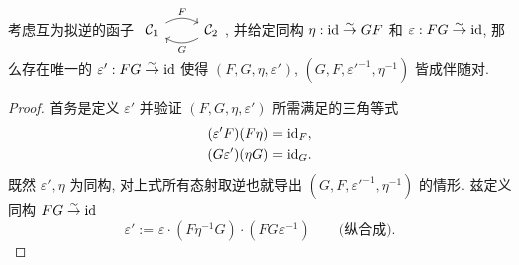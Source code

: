 \begin{theorem}[伴随等价] \label{prop:adjoint-equivalence}
	考虑互为拟逆的函子
	$\begin{tikzcd}
		\mathcal{C}_1 \arrow[r, bend left, "F"] & \mathcal{C}_2 \arrow[l, bend left, "G"]
	\end{tikzcd}$, 并给定同构 $\eta: \mathrm{id} \stackrel{\sim}{\rightarrow} GF$ 和 $\varepsilon: FG \stackrel{\sim}{\rightarrow} \mathrm{id}$, 那么存在唯一的 $\varepsilon': FG \stackrel{\sim}{\rightarrow} \mathrm{id}$ 使得 $(F, G, \eta, \varepsilon')$, $(G, F, \varepsilon'^{-1}, \eta^{-1})$ 皆成伴随对.
\end{theorem}
\begin{proof}
	首务是定义 $\varepsilon'$ 并验证 $(F, G, \eta, \varepsilon')$ 所需满足的三角等式
	\begin{align}
		\label{eqn:adj-zigzag-1} (\varepsilon' F)(F\eta) & = \mathrm{id}_F, \\
		\label{eqn:adj-zigzag-2} (G\varepsilon')(\eta G) & = \mathrm{id}_G.
	\end{align}
	既然 $\varepsilon', \eta$ 为同构, 对上式所有态射取逆也就导出 $(G, F, \varepsilon'^{-1}, \eta^{-1})$ 的情形. 兹定义同构 $FG \stackrel{\sim}{\rightarrow} \mathrm{id}$
	\[ \varepsilon' := \varepsilon \cdot (F\eta^{-1}G) \cdot (FG\varepsilon^{-1}) \qquad \text{(纵合成)}. \]


\end{proof}
